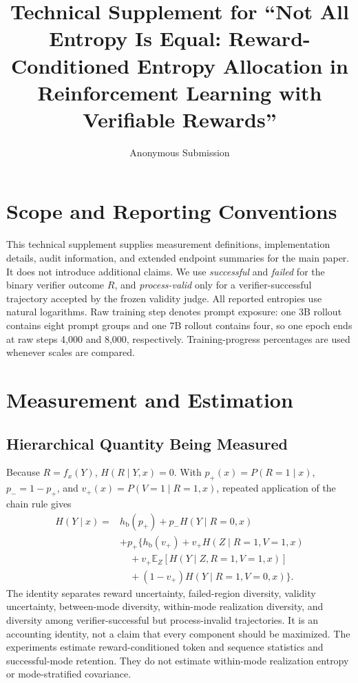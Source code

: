 \documentclass[letterpaper]{article}
\title{Technical Supplement for ``Not All Entropy Is Equal: Reward-Conditioned Entropy Allocation in Reinforcement Learning with Verifiable Rewards''}
\author{Anonymous Submission}
\begin{document}
\maketitle

\section{Scope and Reporting Conventions}

This technical supplement supplies measurement definitions, implementation details, audit
information, and extended endpoint summaries for the main paper.  It does not
introduce additional claims.  We use \emph{successful} and \emph{failed} for
the binary verifier outcome \(R\), and \emph{process-valid} only for a
verifier-successful trajectory accepted by the frozen validity judge.  All
reported entropies use natural logarithms.  Raw training step denotes prompt
exposure: one 3B rollout contains eight prompt groups and one 7B rollout
contains four, so one epoch ends at raw steps 4,000 and 8,000, respectively.
Training-progress percentages are used whenever scales are compared.

\section{Measurement and Estimation}
\label{sec:sup-measurement}

\subsection{Hierarchical Quantity Being Measured}

Because \(R=f_x(Y)\), \(H(R\mid Y,x)=0\).  With
\(p_+(x)=P(R=1\mid x)\), \(p_-=1-p_+\), and
\(v_+(x)=P(V=1\mid R=1,x)\), repeated application of the chain rule gives
\begin{equation}
\begin{aligned}
H(Y\mid x)
={}&h_{\mathrm b}(p_+)+p_-H(Y\mid R=0,x)\\
&+p_+\big\{h_{\mathrm b}(v_+)
+v_+H(Z\mid R=1,V=1,x)\\
&\quad+v_+\mathbb E_Z[H(Y\mid Z,R=1,V=1,x)]\\
&\quad+(1-v_+)H(Y\mid R=1,V=0,x)\big\}.
\end{aligned}
\label{eq:sup-hierarchical-decomposition}
\end{equation}
The identity separates reward uncertainty, failed-region diversity, validity
uncertainty, between-mode diversity, within-mode realization diversity, and
diversity among verifier-successful but process-invalid trajectories.  It is
an accounting identity, not a claim that every component should be maximized.
The experiments estimate reward-conditioned token and sequence statistics and
successful-mode retention.  They do not estimate within-mode realization
entropy or mode-stratified covariance.
\end{document}
